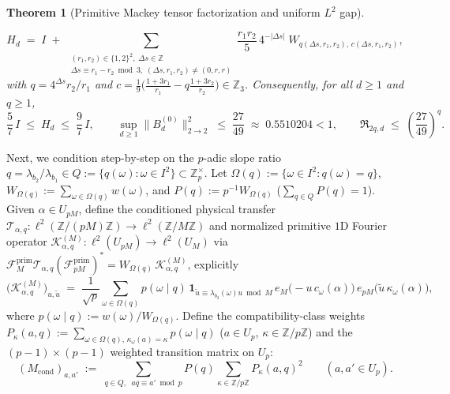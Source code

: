 \documentclass[11pt,a4paper]{article}
\numberwithin{equation}{section}
\newtheorem{theorem}{Theorem}[section]
\theoremstyle{definition}
\theoremstyle{remark}
\newcommand{\Z}{\mathbb{Z}}
\newcommand{\cF}{\mathcal{F}}
\newcommand{\cT}{\mathcal{T}}
\newcommand{\cK}{\mathcal{K}}
\newcommand{\prim}{\mathrm{prim}}
\begin{document}
\begin{theorem}[Primitive Mackey tensor factorization and uniform $L^2$ gap]
\begin{enumerate}[label=(\arabic*)]
\[
H_d \;=\; I \;+\; \sum_{\substack{(r_1, r_2) \in \{1, 2\}^2,\; \Delta s \in \Z \\ \Delta s \equiv r_1 - r_2 \bmod 3,\; (\Delta s, r_1, r_2) \neq (0, r, r)}} \frac{r_1 r_2}{5}\,4^{-|\Delta s|}\; W_{q(\Delta s, r_1, r_2),\, c(\Delta s, r_1, r_2)},
\]
with $q = 4^{\Delta s} r_2/r_1$ and $c = \frac{1}{9}\bigl(\frac{1+3r_1}{r_1} - q\frac{1+3r_2}{r_2}\bigr) \in \Z_3$. Consequently, for all $d \ge 1$ and $q \ge 1$,
\[
\frac{5}{7}\, I \;\le\; H_d \;\le\; \frac{9}{7}\, I, \qquad
\sup_{d \ge 1}\bigl\|B_d^{(0)}\bigr\|_{2\to 2}^2 \;\le\; \frac{27}{49} \;\approx\; 0.5510204 < 1, \qquad
\mathfrak{R}_{2q, d} \;\le\; \left(\frac{27}{49}\right)^q.
\]
\end{enumerate}
\end{theorem}

Next, we condition step-by-step on the $p$-adic slope ratio $q = \lambda_{b_2}/\lambda_{b_1} \in Q := \{q(\omega) : \omega \in I^2\} \subset \Z_p^\times$. Let $\Omega(q) := \{\omega \in I^2 : q(\omega) = q\}$, $W_{\Omega(q)} := \sum_{\omega \in \Omega(q)} w(\omega)$, and $P(q) := p^{-1} W_{\Omega(q)}$ ($\sum_{q \in Q} P(q) = 1$). Given $\alpha \in U_{pM}$, define the conditioned physical transfer $\cT_{\alpha, q} : \ell^2(\Z/(pM)\Z) \to \ell^2(\Z/M\Z)$ and normalized primitive $1$D Fourier operator $\cK_{\alpha, q}^{(M)} : \ell^2(U_{pM}) \to \ell^2(U_M)$ via $\cF_M^{\prim} \cT_{\alpha, q} (\cF_{pM}^{\prim})^* = W_{\Omega(q)}\,\cK_{\alpha, q}^{(M)}$, explicitly
\[
\bigl(\cK_{\alpha, q}^{(M)}\bigr)_{u, \tilde u} \;=\; \frac{1}{\sqrt{p}} \sum_{\omega \in \Omega(q)} p(\omega \mid q)\,\mathbf{1}_{\tilde u \equiv \lambda_{b_2}(\omega) u \bmod M}\, e_M\bigl(-u\,c_\omega(\alpha)\bigr)\, e_{pM}\bigl(\tilde u\,\kappa_\omega(\alpha)\bigr),
\]
where $p(\omega \mid q) := w(\omega)/W_{\Omega(q)}$. Define the compatibility-class weights $P_\kappa(a, q) := \sum_{\omega \in \Omega(q),\, \kappa_\omega(a) = \kappa} p(\omega \mid q)$ ($a \in U_p$, $\kappa \in \Z/p\Z$) and the $(p-1)\times(p-1)$ weighted transition matrix on $U_p$:
\[
(M_{\mathrm{cond}})_{a, a'} \;:=\; \sum_{q \in Q,\;\; a q \equiv a' \bmod p} P(q)\sum_{\kappa \in \Z/p\Z} P_\kappa(a, q)^2 \qquad (a, a' \in U_p).
\]
\end{document}
